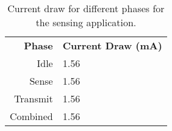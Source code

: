 \begin{table}[h]
        {\footnotesize
            \begin{tabularx}{\textwidth}{rl}

                \textbf{Phase} &
                \textbf{Current Draw (mA)} \\ 

                Idle &
                1.56 \\ 
                Sense &
                1.56 \\
                Transmit &
                1.56 \\
                Combined &
                1.56 \\


            \end{tabularx}
        }

        \vspace{-0.1in}

        \caption{Current draw for different phases for the sensing application.}

        \vspace{0.1in}
        \vspace{-0.2in}

    \label{table-currentdraw}
\end{table}
